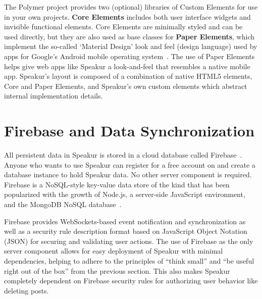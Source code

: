 The Polymer project provides two (optional) libraries of Custom Elements for use in your own projects. 
\textbf{Core Elements} includes both user interface
widgets and invisible functional elements.
Core Elements are minimally styled and can be used directly, 
but they are also used as base classes for 
\textbf{Paper Elements}, 
which implement the so-called `Material Design' look and feel (design language) used by apps for Google's Android mobile operating system~\cite{imura2015}.
The use of Paper Elements helps give web apps like Speakur a look-and-feel that resembles a native mobile app.
Speakur's layout is composed of a combination of native HTML5 elements, 
Core and Paper Elements, 
and Speakur's own custom elements which abstract internal implementation details.

\section{Firebase and Data Synchronization}
All persistent data in Speakur is stored in a cloud database called Firebase~\cite{firebasecontributors2015}.
Anyone who wants to use Speakur can register for a free account on  and create a database instance to hold Speakur data.
No other server component is required.
Firebase is a NoSQL-style key-value data store of the kind that has been popularized
with the growth of 
Node.js, a server-side JavaScript environment,
and the MongoDB NoSQL database~\cite{dickey2014}.

Firebase provides WebSockets-based event notification and synchronization 
as well as a security rule description format based on 
JavaScript Object Notation (JSON)
for securing and validating user actions.
The use of Firebase as the only server component allows for easy deployment of Speakur with minimal dependencies, helping to adhere to the principles of ``think small'' and ``be useful right out of the box'' from the previous section.
This also makes Speakur completely dependent on Firebase security rules for authorizing user behavior like deleting posts.


